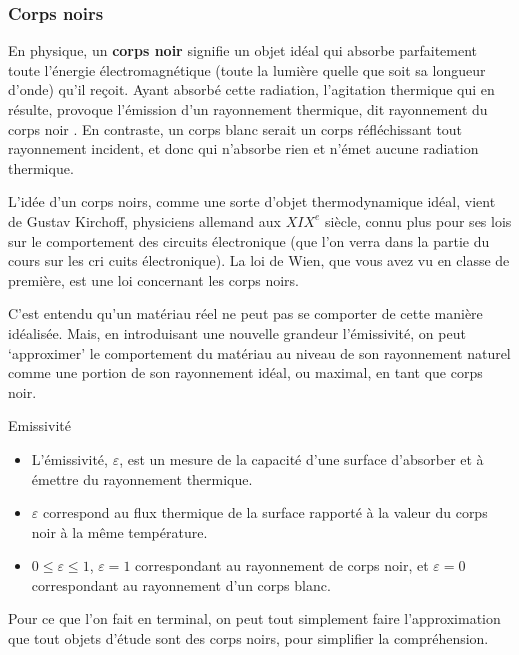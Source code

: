 \documentclass[11pt,a4paper]{article}
\begin{document}
\subsubsection{Corps noirs}

En physique, un \textbf{corps noir} signifie un objet idéal qui absorbe parfaitement toute l'énergie électromagnétique (toute la lumière quelle que soit sa longueur d'onde) qu'il reçoit. Ayant absorbé cette radiation, l'agitation thermique qui en résulte, provoque l'émission d'un rayonnement thermique, dit rayonnement du corps noir . En contraste, un corps blanc serait un corps réfléchissant tout rayonnement incident, et donc qui n'absorbe rien et n'émet aucune radiation thermique. 

L'idée d'un corps noirs, comme une sorte d'objet thermodynamique idéal, vient de Gustav Kirchoff, physiciens allemand aux $XIX^e$ siècle, connu plus pour ses lois sur le comportement des circuits électronique (que l'on verra dans la partie du cours sur les cri cuits électronique). La loi de Wien, que vous avez vu en classe de première, est une loi concernant les corps noirs. 

C'est entendu qu'un matériau réel ne peut pas se comporter de cette manière idéalisée. Mais, en introduisant une nouvelle grandeur l'émissivité, on peut `approximer' le comportement du matériau au niveau de son rayonnement naturel comme une portion de son rayonnement idéal, ou maximal, en tant que corps noir. 

\begin{defn}{Emissivité}
\begin{itemize}
    \item L'émissivité, $\varepsilon$, est un mesure de la capacité d'une surface d'absorber et à émettre du rayonnement thermique. 
    \item $\varepsilon$ correspond au flux thermique de la surface rapporté à la valeur du corps noir à la même température. 
    \item $0 \leq \varepsilon \leq 1$, $\varepsilon=1$ correspondant au rayonnement de corps noir, et $\varepsilon=0$ correspondant au rayonnement d'un corps blanc. 
\end{itemize}
\end{defn}

Pour ce que l'on fait en terminal, on peut tout simplement faire l'approximation que tout objets d'étude sont des corps noirs, pour simplifier la compréhension. 
\end{document}
